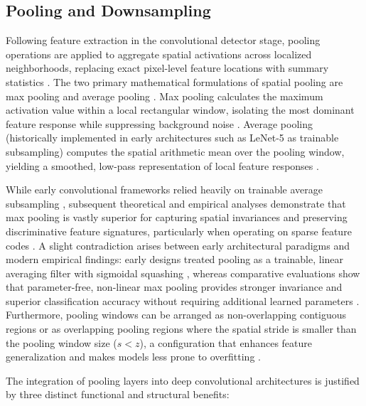 \subsection{Pooling and Downsampling}

Following feature extraction in the convolutional detector stage, pooling operations are applied to aggregate spatial activations across localized neighborhoods, replacing exact pixel-level feature locations with summary statistics \parencite{Goodfellow-et-al-2016, scherer_evaluation_2010}. The two primary mathematical formulations of spatial pooling are max pooling and average pooling \parencite{Goodfellow-et-al-2016, scherer_evaluation_2010, Boureau_CNN_2010}. Max pooling calculates the maximum activation value within a local rectangular window, isolating the most dominant feature response while suppressing background noise \parencite{Goodfellow-et-al-2016, scherer_evaluation_2010, Boureau_CNN_2010}. Average pooling (historically implemented in early architectures such as LeNet-5 as trainable subsampling) computes the spatial arithmetic mean over the pooling window, yielding a smoothed, low-pass representation of local feature responses \parencite{Goodfellow-et-al-2016, scherer_evaluation_2010, lecun_gradient-based_1998}.

While early convolutional frameworks relied heavily on trainable average subsampling \parencite{lecun_gradient-based_1998}, subsequent theoretical and empirical analyses demonstrate that max pooling is vastly superior for capturing spatial invariances and preserving discriminative feature signatures, particularly when operating on sparse feature codes \parencite{scherer_evaluation_2010, Boureau_CNN_2010}. A slight contradiction arises between early architectural paradigms and modern empirical findings: early designs treated pooling as a trainable, linear averaging filter with sigmoidal squashing \parencite{lecun_gradient-based_1998}, whereas comparative evaluations show that parameter-free, non-linear max pooling provides stronger invariance and superior classification accuracy without requiring additional learned parameters \parencite{scherer_evaluation_2010, Boureau_CNN_2010}. Furthermore, pooling windows can be arranged as non-overlapping contiguous regions or as overlapping pooling regions where the spatial stride is smaller than the pooling window size ($s < z$), a configuration that enhances feature generalization and makes models less prone to overfitting \parencite{Krizhevsky_ImageNET}.

The integration of pooling layers into deep convolutional architectures is justified by three distinct functional and structural benefits:

